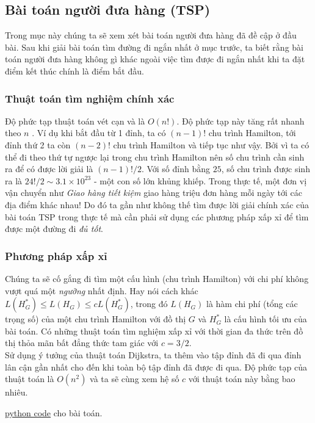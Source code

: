 
\subsection{Bài toán người đưa hàng (TSP)}
Trong mục này chúng ta sẽ xem xét bài toán người đưa hàng đã đề cập ở đầu bài.
Sau khi giải bài toán tìm đường đi ngắn nhất ở mục trước, ta biết rằng bài toán
người đưa hàng không gì khác ngoài việc tìm được đi ngắn nhất khi ta đặt điểm
kết thúc chính là điểm bắt đầu. 
\subsubsection{Thuật toán tìm nghiệm chính xác}
Độ phức tạp thuật toán vét cạn và là $O (n!)$.
Độ phức tạp này tăng rất nhanh theo $n$ . Ví dụ khi bắt đầu từ 1 đỉnh, ta có $(n-1)!$
chu trình Hamilton, tới đỉnh thứ 2 ta còn $(n-2)!$ chu trình Hamilton và tiếp tục như vậy.
Bởi vì ta có thể đi theo thứ tự ngược lại trong chu trình Hamilton nên số chu trình cần
sinh ra để có được lời giải là $(n-1)!/2$. Với số đỉnh bằng $25$, số chu trình được sinh 
ra là $24!/2 \sim 3.1 \times 10^{23}$ - một con số lớn khủng khiếp. Trong thực tế, 
một đơn vị vận chuyển như \textit{Giao hàng tiết kiệm} giao hàng triệu đơn hàng mỗi ngày 
tới các địa điểm khác nhau! Do đó ta gần như không thế tìm được lời giải chính xác của bài 
toán TSP trong thực tế mà cần phải sử dụng các phương pháp xấp xỉ để tìm được một 
đường đi \textit{đủ tốt}.

\subsubsection{Phương pháp xấp xỉ}
Chúng ta sẽ cố gắng đi tìm một cấu hình (chu trình Hamilton) với chi phí không vượt quá
một \textit{ngưỡng} nhất định. Hay nói cách khác $L(H^*_{G}) \leq L(H_{G}) \leq cL(H^*_{G})$,
trong đó $L(H_G)$ là hàm chi phí (tổng các trọng số) của một chu trình Hamilton với
đồ thị $G$ và $H^*_G$ là cấu hình tối ưu của bài toán. Có những thuật toán tìm nghiệm 
xấp xỉ với thời gian đa thức trên đồ thị thỏa mãn bất đẳng thức tam giác với $c = 3/2$. \\

Sử dụng ý tưởng của thuật toán Dijkstra, ta thêm vào tập đỉnh đã đi qua đỉnh lân cận 
gần nhất cho đến khi toàn bộ tập đỉnh đã được đi qua. Độ phức tạp của thuật toán là $O(n^2)$
và ta sẽ cùng xem hệ số $c$ với thuật toán này bằng bao nhiêu.

\href{https://github.com/batman0911/dma_homework/blob/master/hw_02/src/travelling_salesman.ipynb}{python code} 
    cho bài toán. \\